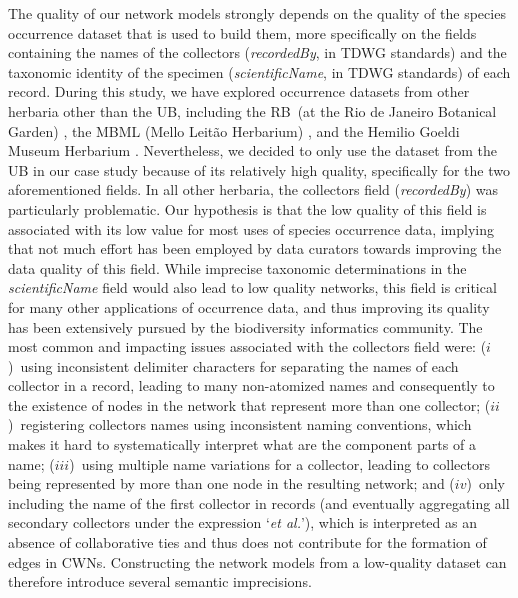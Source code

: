 The quality of our network models strongly depends on the quality of the species occurrence dataset that is used to build them, more specifically on the fields containing the names of the collectors (\textit{recordedBy}, in TDWG standards) and the taxonomic identity of the specimen (\textit{scientificName}, in TDWG standards) of each record.
%
During this study, we have explored occurrence datasets from other herbaria other than the UB, including the RB~(at the Rio de Janeiro Botanical Garden) \cite{gbif_rb}, 
the MBML (Mello Leitão Herbarium) \cite{gbif_mbml},
and the Hemilio Goeldi Museum Herbarium \cite{gbif_mpegh}.
Nevertheless, we decided to only use the dataset from the UB in our case study because of its relatively high quality, specifically for the two aforementioned fields.
%
In all other herbaria, the collectors field (\textit{recordedBy}) was particularly problematic.
Our hypothesis is that the low quality of this field is associated with its low value for most uses of species occurrence data, implying that not much effort has been employed by data curators towards improving the data quality of this field.
While imprecise taxonomic determinations in the \textit{scientificName} field would also lead to low quality networks, this field is critical for many other applications of occurrence data, and thus improving its quality has been extensively pursued by the biodiversity informatics community.
The most common and impacting issues associated with the collectors field were: 
($i$)~using inconsistent delimiter characters for separating the names of each collector in a record, leading to many non-atomized names and consequently to the existence of nodes in the network that represent more than one collector; 
($ii$)~registering collectors names using inconsistent naming conventions, which makes it hard to systematically interpret what are the component parts of a name; 
($iii$)~using multiple name variations for a collector, leading to collectors being represented by more than one node in the resulting network; and 
($iv$)~only including the name of the first collector in records (and eventually aggregating all secondary collectors under the expression `\textit{et al.}'), which is interpreted as an absence of collaborative ties and thus does not contribute for the formation of edges in CWNs.
Constructing the network models from a low-quality dataset can therefore introduce several semantic imprecisions. 

